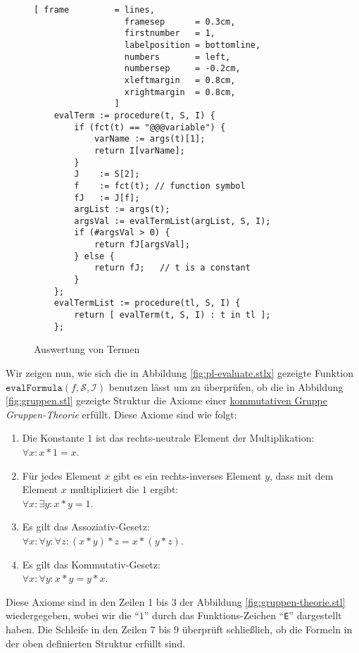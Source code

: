 \begin{figure}[!ht]
\centering
\begin{Verbatim}[ frame         = lines, 
                  framesep      = 0.3cm, 
                  firstnumber   = 1,
                  labelposition = bottomline,
                  numbers       = left,
                  numbersep     = -0.2cm,
                  xleftmargin   = 0.8cm,
                  xrightmargin  = 0.8cm,
                ]
    evalTerm := procedure(t, S, I) {
        if (fct(t) == "@@@variable") {
            varName := args(t)[1];
            return I[varName];
        }
        J    := S[2];
        f    := fct(t); // function symbol
        fJ   := J[f];
        argList := args(t);
        argsVal := evalTermList(argList, S, I);
        if (#argsVal > 0) {        
            return fJ[argsVal]; 
        } else {
            return fJ;   // t is a constant
        }
    };
    evalTermList := procedure(tl, S, I) {
        return [ evalTerm(t, S, I) : t in tl ];
    };
\end{Verbatim}
\vspace*{-0.3cm}
\caption{Auswertung von Termen}
\label{fig:evalTerm.stlx}
\end{figure}


Wir zeigen nun, wie sich die in Abbildung \ref{fig:pl-evaluate.stlx} gezeigte Funktion
$\texttt{evalFormula}(f, \mathcal{S}, \mathcal{I})$ benutzen l\"{a}sst um zu \"{u}berpr\"{u}fen, ob die
in Abbildung \ref{fig:gruppen.stl} gezeigte Struktur die Axiome einer
\href{https://en.wikipedia.org/wiki/Abelian_group}{kommutativen Gruppe}
\emph{Gruppen-Theorie}
erf\"{u}llt.  Diese Axiome sind wie folgt:
\begin{enumerate}
\item Die Konstante $1$ ist das rechts-neutrale Element der Multiplikation:
      \\[0.2cm]
      \hspace*{1.3cm}
      $\forall x\colon x * 1 = x$.
\item F\"{u}r jedes Element $x$ gibt es ein rechts-inverses Element $y$, dass mit
      dem Element $x$ multipliziert die $1$ ergibt:      
      \\[0.2cm]
      \hspace*{1.3cm}
      $\forall x \colon \exists y \colon x * y = 1$.
\item Es gilt das Assoziativ-Gesetz:
      \\[0.2cm]
      \hspace*{1.3cm}
      $\forall x \colon \forall y \colon \forall z \colon (x * y) * z = x * (y * z)$.
\item Es gilt das Kommutativ-Gesetz:
      \\[0.2cm]
      \hspace*{1.3cm}
      $\forall x \colon \forall y \colon x * y = y * x$.
\end{enumerate}
Diese Axiome sind in den Zeilen 1 bis 3 der Abbildung \ref{fig:gruppen-theorie.stl}
wiedergegeben, wobei wir die ``$1$'' durch das Funktions-Zeichen ``\texttt{E}'' dargestellt haben.
Die Schleife in den Zeilen 7 bis 9 \"{u}berpr\"{u}ft schlie\ss{}lich, ob die Formeln in der oben
definierten Struktur erf\"{u}llt sind.


